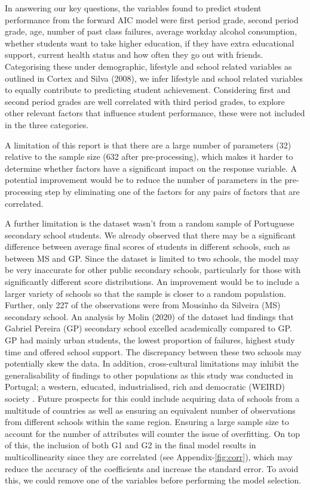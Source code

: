 \documentclass[a4paper,8pt,twocolumn,twoside,]{pinp}
\begin{document}
In answering our key questions, the variables found to predict student
performance from the forward AIC model were first period grade, second
period grade, age, number of past class failures, average workday
alcohol consumption, whether students want to take higher education, if
they have extra educational support, current health status and how often
they go out with friends. Categorising these under demographic,
lifestyle and school related variables as outlined in Cortex and Silva
(2008), we infer lifestyle and school related variables to equally
contribute to predicting student achievement. Considering first and
second period grades are well correlated with third period grades, to
explore other relevant factors that influence student performance, these
were not included in the three categories.

A limitation of this report is that there are a large number of
parameters (32) relative to the sample size (632 after pre-processing),
which makes it harder to determine whether factors have a significant
impact on the response variable. A potential improvement would be to
reduce the number of parameters in the pre-processing step by
eliminating one of the factors for any pairs of factors that are
correlated.

A further limitation is the dataset wasn't from a random sample of
Portuguese secondary school students. We already observed that there may
be a significant difference between average final scores of students in
different schools, such as between MS and GP. Since the dataset is
limited to two schools, the model may be very inaccurate for other
public secondary schools, particularly for those with significantly
different score distributions. An improvement would be to include a
larger variety of schools so that the sample is closer to a random
population. Further, only 227 of the observations were from Mousinho da
Silveira (MS) secondary school. An analysis by Molin (2020) of the
dataset had findings that Gabriel Pereira (GP) secondary school excelled
academically compared to GP. GP had mainly urban students, the lowest
proportion of failures, highest study time and offered school support.
The discrepancy between these two schools may potentially skew the data.
In addition, cross-cultural limitations may inhibit the generalisability
of findings to other populations as this study was conducted in
Portugal; a western, educated, industrialised, rich and democratic
(WEIRD) society . Future prospects for this could include acquiring data
of schools from a multitude of countries as well as ensuring an
equivalent number of observations from different schools within the same
region. Ensuring a large sample size to account for the number of
attributes will counter the issue of overfitting. On top of this, the
inclusion of both G1 and G2 in the final model results in
multicollinearity since they are correlated (see
Appendix-\ref{fig:corr}), which may reduce the accuracy of the
coefficients and increase the standard error. To avoid this, we could
remove one of the variables before performing the model selection.
\end{document}
